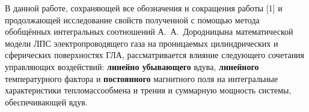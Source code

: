 \vzmscaption




    В  данной  работе, 
сохраняющей  все  обозначения  
и  сокращения  работы 
[1] 
и
продолжающей  исследование  свойств  
полученной
с  помощью  метода  
обобщённых  интегральных  соотношений 
А.~А.~Дородницына 
математической  модели  
ЛПС
электропроводящего  газа  
на  проницаемых  цилиндрических  
и  сферических  поверхностях  
ГЛА,   
рассматривается  влияние  
следующего  сочетания
управляющих  воздействий:
\textbf{линейно  убывающего}
вдува,  
\textbf{линейного}
температурного  фактора  
и  
\textbf{постоянного} 
магнитного  поля  
на  
интегральные 
характеристики  
тепломассообмена  и  трения
и  
суммарную  мощность  
системы,  
обеспечивающей  вдув.  



